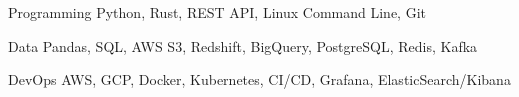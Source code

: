 

\begin{cvskills}

  \cvskill
    {Programming} %
    {Python, Rust, REST API, Linux Command Line, Git} %
    
  \cvskill
    {Data} %
    {Pandas, SQL, AWS S3, Redshift, BigQuery, PostgreSQL, Redis, Kafka} %
        
  \cvskill
    {DevOps} %
    {AWS, GCP, Docker, Kubernetes, CI/CD, Grafana, ElasticSearch/Kibana} %

\end{cvskills}
